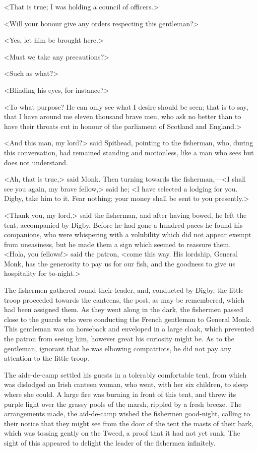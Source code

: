 <That is true; I was holding a council of officers.>

<Will your honour give any orders respecting this gentleman?>

<Yes, let him be brought here.>

<Must we take any precautions?>

<Such as what?>

<Blinding his eyes, for instance?>

<To what purpose? He can only see what I desire should be seen; that is to say, that I have around me eleven thousand brave men, who ask no better than to have their throats cut in honour of the parliament of Scotland and England.>

<And this man, my lord?> said Spithead, pointing to the fisherman, who, during this conversation, had remained standing and motionless, like a man who sees but does not understand.

<Ah, that is true,> said Monk. Then turning towards the fisherman,—<I shall see you again, my brave fellow,> said he; <I have selected a lodging for you. Digby, take him to it. Fear nothing; your money shall be sent to you presently.>

<Thank you, my lord,> said the fisherman, and after having bowed, he left the tent, accompanied by Digby. Before he had gone a hundred paces he found his companions, who were whispering with a volubility which did not appear exempt from uneasiness, but he made them a sign which seemed to reassure them. <Hola, you fellows!> said the patron, <come this way. His lordship, General Monk, has the generosity to pay us for our fish, and the goodness to give us hospitality for to-night.>

The fishermen gathered round their leader, and, conducted by Digby, the little troop proceeded towards the canteens, the post, as may be remembered, which had been assigned them. As they went along in the dark, the fishermen passed close to the guards who were conducting the French gentleman to General Monk. This gentleman was on horseback and enveloped in a large cloak, which prevented the patron from seeing him, however great his curiosity might be. As to the gentleman, ignorant that he was elbowing compatriots, he did not pay any attention to the little troop.

The aide-de-camp settled his guests in a tolerably comfortable tent, from which was dislodged an Irish canteen woman, who went, with her six children, to sleep where she could. A large fire was burning in front of this tent, and threw its purple light over the grassy pools of the marsh, rippled by a fresh breeze. The arrangements made, the aid-de-camp wished the fishermen good-night, calling to their notice that they might see from the door of the tent the masts of their bark, which was tossing gently on the Tweed, a proof that it had not yet sunk. The sight of this appeared to delight the leader of the fishermen infinitely. 